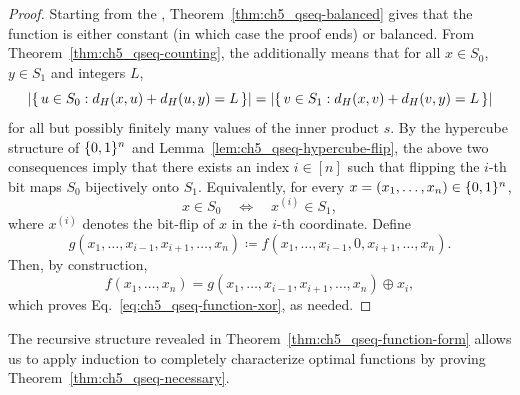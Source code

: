 \begin{proof}
    Starting from the \gammacomm{}, Theorem~\ref{thm:ch5_qseq-balanced} gives that the function is either constant (in which case the proof ends) or balanced.
    From Theorem~\ref{thm:ch5_qseq-counting}, the \gammacomm{} additionally means that for all $x \in S_0$, $y \in S_1$ and integers $L$,
    \begin{equation}\label{eq:ch5_qseq-counting-balance}
        \abs{\{\,u \in S_0 : d_H(x,u) + d_H(u,y) = L\,\}}
        =
        \abs{\{\,v \in S_1 : d_H(x,v) + d_H(v,y) = L\,\}}
    \end{equation}
    for all but possibly finitely many values of the inner product $s$.
    By the hypercube structure of $\{ 0, 1 \}^n$ and Lemma~\ref{lem:ch5_qseq-hypercube-flip}, the above two consequences imply that there exists an index $i \in [n]$ such that flipping the $i$-th bit maps $S_0$ bijectively onto $S_1$.
    Equivalently, for every $x=(x_1,\ldots,x_n)\in\{ 0, 1 \}^n$,
    \begin{equation}
        x \in S_0
        \quad\Longleftrightarrow\quad
        x^{(i)} \in S_1,
    \end{equation}
    where $x^{(i)}$ denotes the bit-flip of $x$ in the $i$-th coordinate.
    Define
    \begin{equation}
        g(x_1,\ldots,x_{i-1},x_{i+1},\ldots,x_n)
        \coloneqq f(x_1,\ldots,x_{i-1},0,x_{i+1},\ldots,x_n).
    \end{equation}
    Then, by construction,
    \begin{equation}
        f(x_1,\ldots,x_n)
        =
        g(x_1,\ldots,x_{i-1},x_{i+1},\ldots,x_n) \oplus x_i,
    \end{equation}
    which proves Eq.~\eqref{eq:ch5_qseq-function-xor}, as needed.
\end{proof}

The recursive structure revealed in Theorem~\ref{thm:ch5_qseq-function-form} allows us to apply induction to completely characterize optimal functions by proving Theorem~\ref{thm:ch5_qseq-necessary}.

